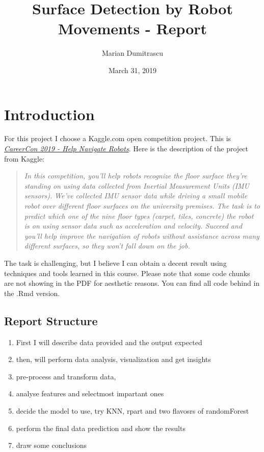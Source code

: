 \documentclass[]{article}
\title{Surface Detection by Robot Movements - Report}
\author{Marian Dumitrascu}
\date{March 31, 2019}
\providecommand{\tightlist}{%
  \setlength{\itemsep}{0pt}\setlength{\parskip}{0pt}}
\begin{document}
\maketitle

\hypertarget{introduction}{%
\section{Introduction}\label{introduction}}

For this project I choose a Kaggle.com open competition project. This is
\href{https://www.kaggle.com/c/career-con-2019}{\emph{CareerCon 2019 -
Help Navigate Robots}}. Here is the description of the project from
Kaggle:

\begin{quote}
\emph{In this competition, you'll help robots recognize the floor
surface they're standing on using data collected from Inertial
Measurement Units (IMU sensors).} \emph{We've collected IMU sensor data
while driving a small mobile robot over different floor surfaces on the
university premises. The task is to predict which one of the nine floor
types (carpet, tiles, concrete) the robot is on using sensor data such
as acceleration and velocity. Succeed and you'll help improve the
navigation of robots without assistance across many different surfaces,
so they won't fall down on the job.}
\end{quote}

The task is challenging, but I believe I can obtain a decent result
using techniques and tools learned in this course. Please note that some
code chunks are not showing in the PDF for aesthetic reasons. You can
find all code behind in the .Rmd version.

\hypertarget{report-structure}{%
\subsection{Report Structure}\label{report-structure}}

\begin{enumerate}
\def\labelenumi{\arabic{enumi}.}
\tightlist
\item
  First I will describe data provided and the output expected
\item
  then, will perform data analysis, visualization and get insights
\item
  pre-process and transform data,
\item
  analyse features and selectmost impartant ones
\item
  decide the model to use, try KNN, rpart and two flavosrs of
  randomForest
\item
  perform the final data prediction and show the results
\item
  draw some conclusions
\end{enumerate}
\end{document}
